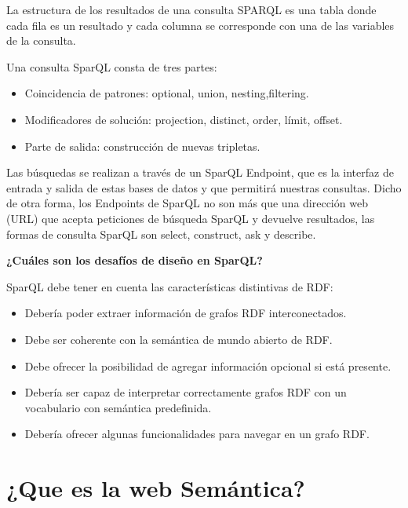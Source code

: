 \documentclass[conference]{IEEEtran}
\begin{document}
\vspace{0.5cm}
La estructura de los resultados de una consulta SPARQL es una tabla donde cada fila es un resultado y cada columna se corresponde con una de las variables de la consulta.

Una consulta SparQL consta de tres partes:
\begin{itemize}
    \item  Coincidencia de patrones: optional, union, nesting,filtering.
    \item  Modificadores de solución: projection, distinct, order, límit, offset.
    \item  Parte de salida: construcción de nuevas tripletas.
\end{itemize}

\vspace{0.5cm}
Las búsquedas se realizan a través de un SparQL Endpoint, que es la interfaz de entrada y salida de estas bases de datos y que permitirá nuestras consultas. Dicho de otra forma, los Endpoints de SparQL no son más que una dirección web (URL) que acepta peticiones de búsqueda SparQL y devuelve resultados, las formas de consulta SparQL son select, construct, ask y describe.

\vspace{0.5cm}
\textbf{¿Cuáles son los desafíos de diseño en SparQL?}
\vspace{0.5cm}

SparQL debe tener en cuenta las características distintivas de RDF:
\begin{itemize}
    \item Debería poder extraer información de grafos RDF interconectados.
    \item Debe ser coherente con la semántica de mundo abierto de RDF.
    \item Debe ofrecer la posibilidad de agregar información opcional si está presente. 
    \item Debería ser capaz de interpretar correctamente grafos RDF con un vocabulario con semántica predefinida.
    \item Debería ofrecer algunas funcionalidades para navegar en un grafo RDF.
\end{itemize}

\vspace{0.2cm}

\section{¿Que es la web Semántica?}
\end{document}
